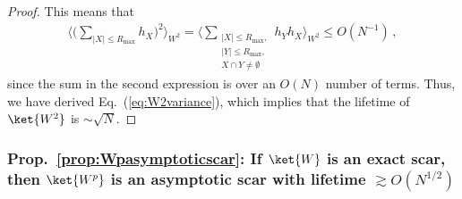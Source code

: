 \documentclass[prx,letterpaper,aps,superscriptaddress,floatfix,twocolumn,nofootinbib]{revtex4-2}
\theoremstyle{definition}
\begin{document}
\begin{proof}
    This means that
    \begin{align}
        \bigg\langle \bigg(\sum_{|X|\leq R_{\text{max}}}h_X \bigg)^2\bigg\rangle_{W^2}= \bigg\langle \sum_{\substack{|X|\leq R_{\text{max}},\\ |Y|\leq R_{\text{max}},\\ X\cap Y\neq\emptyset}}h_Y h_X\bigg\rangle_{W^2}\leq O({N}^{-1})\,,
    \end{align}
    since the sum in the second expression is over an $O(N)$ number of terms.
    Thus, we have derived Eq.~(\ref{eq:W2variance}), which implies that the lifetime of $\ket{W^2}$ is $\sim\sqrt{N}$.
\end{proof}

\subsubsection{Prop.~\ref{prop:Wpasymptoticscar}: If $\ket{W}$ is an exact scar, then $\ket{W^p}$ is an asymptotic scar with lifetime $\gtrsim O(N^{1/2})$}
\label{app:Wpasymptoticscar}
%
\end{document}
